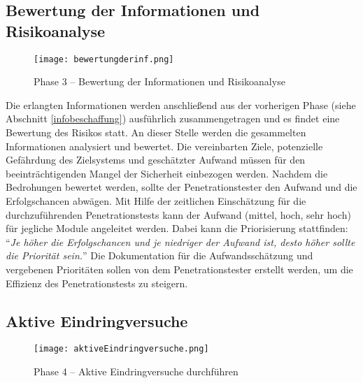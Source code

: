 \newpage

\subsection{Bewertung der Informationen und Risikoanalyse}
\label{bewinfrisiko}

\begin{figure}[h]
	\centering
	\texttt{[image: bewertungderinf.png]}
	\caption{Phase 3 – Bewertung der Informationen und Risikoanalyse}
\end{figure}

Die erlangten Informationen werden anschließend aus der vorherigen Phase (siehe Abschnitt \ref{infobeschaffung}) ausführlich zusammengetragen und es findet eine Bewertung des Risikos statt. An dieser Stelle werden die gesammelten Informationen analysiert und bewertet. Die vereinbarten Ziele, potenzielle Gefährdung des Zielsystems und geschätzter Aufwand müssen für den beeinträchtigenden Mangel der Sicherheit einbezogen werden. Nachdem die Bedrohungen bewertet werden, sollte der Penetrationstester den Aufwand und die Erfolgschancen abwägen. Mit Hilfe der zeitlichen Einschätzung für die durchzuführenden Penetrationstests kann der Aufwand (mittel, hoch, sehr hoch) für jegliche Module angeleitet werden. Dabei kann die Priorisierung stattfinden: "`\textit{Je höher die Erfolgschancen und je niedriger der Aufwand ist, desto höher sollte die Priorität sein.}"' Die Dokumentation für die Aufwandsschätzung und vergebenen Prioritäten sollen von dem Penetrationstester erstellt werden, um die Effizienz des Penetrationstests zu steigern\cite[103--104]{pt03bsi}.

\subsection{Aktive Eindringversuche}

\begin{figure}[h]
	\centering
	\texttt{[image: aktiveEindringversuche.png]}
	\caption{Phase 4 – Aktive Eindringversuche durchführen}
\end{figure}

